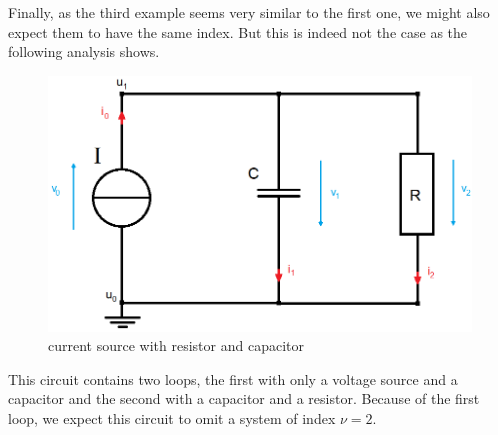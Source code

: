 \begin{example3}
	Finally, as the third example seems very similar to the first one, we might also expect them to have the same index. But this is indeed not the case as the following analysis shows. 
	\begin{figure}[H]
		\centering
		\includegraphics[scale = 0.4]{pictures/Example3.png}
		\caption{current source with resistor and capacitor} 
	\end{figure}
	This circuit contains two loops, the first with only a voltage source and a capacitor and the second with a capacitor and a resistor. Because of the first loop, we expect this circuit to omit a system of index $\nu = 2$.
	

\end{example3}
